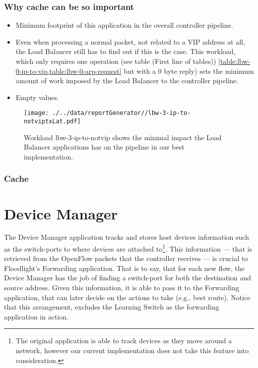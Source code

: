 {\subsubsection{Why cache can be so important}



\begin{itemize}
\item Minimum footprint of this application in the overall controller
  pipeline. 
\item Even when processing a normal packet, not related to a VIP address at
all, the Load Balancer still has to find out if this is the case. This
workload, which only requires one operation (see table (First line of tables))
\ref{table:lbw-0-ip-to-vip,table:lbw-0-arp-request} but with  a 0 byte
reply) sets the minimum amount of work imposed by
the Load Balancer to the controller pipeline. 
\item Empty values. 

\end{itemize}



\begin{figure}[ht]
\centering
\texttt{[image: ./../data/reportGenerator//lbw-3-ip-to-notviptxLat.pdf]}
\caption[Minimum impact of Load Balancer in the pipeline.]{Workload
  lbw-3-ip-to-notvip shows the minimal impact the Load Balancer
  applications has on the pipeline in our best implementation.}
\end{figure}


\subsubsection{Cache}

\section{Device Manager}
\label{sec:feasibility:dm}
\glsresetall


The Device Manager application tracks and stores host devices
information such as the switch-ports to where devices are
attached to\footnote{The original application is able to track devices as
  they move around a network, however our current implementation does
  not take this feature into consideration.}. This information ---
that is retrieved from the OpenFlow packets that the controller receives --- is crucial to
Floodlight’s Forwarding application. That is to say, that for  each new flow, the Device
Manager has the job of finding a switch-port for both the destination
and source address. Given this information, it is able to pass it to
the Forwarding application, that can later decide on the actions to
take (e.g., best route). Notice that this arrangement, excludes the
Learning Switch as the  forwarding application in action. 

}
